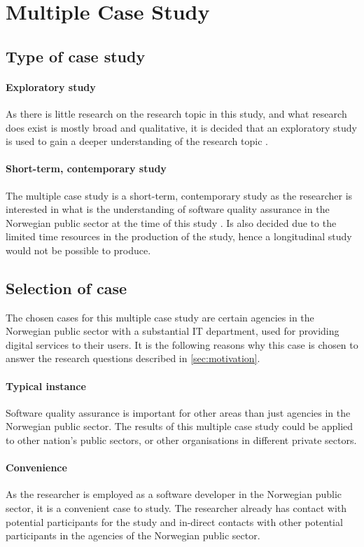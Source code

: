 \section{Multiple Case Study}

\subsection{Type of case study}
\paragraph{Exploratory study}
As there is little research on the research topic in this study, and what research does exist is mostly broad and qualitative, it is decided that an exploratory study is used to gain a deeper understanding of the research topic \cite{bjo_2022}.

\paragraph{Short-term, contemporary study} 
The multiple case study is a short-term, contemporary study as the researcher is interested in what is the understanding of software quality assurance in the Norwegian public sector at the time of this study \cite{bjo_2022}. Is also decided due to the limited time resources in the production of the study, hence a longitudinal study would not be possible to produce.

\subsection{Selection of case}
The chosen cases for this multiple case study are certain agencies in the Norwegian public sector with a substantial IT department, used for providing digital services to their users. It is the following reasons why this case is chosen to answer the research questions described in \autoref{sec:motivation}.

\paragraph{Typical instance}
Software quality assurance is important for other areas than just agencies in the Norwegian public sector. The results of this multiple case study could be applied to other nation's public sectors, or other organisations in different private sectors.

\paragraph{Convenience}
As the researcher is employed as a software developer in the Norwegian public sector, it is a convenient case to study. The researcher already has contact with potential participants for the study and in-direct contacts with other potential participants in the agencies of the Norwegian public sector.


